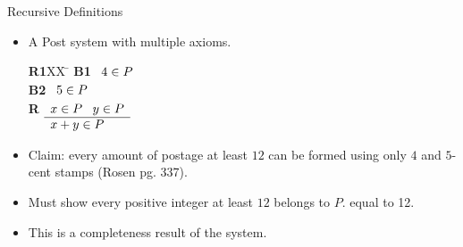 \documentclass[style=sailor,size=12pt]{powerdot}
\begin{document}
\begin{wideslide}[bm=,toc=]{Recursive Definitions}
\begin{itemize}
\item A Post system with multiple axioms.
\begin{tabbing}
{\bf R1}XX \=  \kill
{\bf B1} \>
        \(\begin{array}[t]{l}
        4\in P
        \end{array}\) \\[2ex]
{\bf B2} \>
        \(\begin{array}[t]{l}
        5\in P
        \end{array}\) \\[2ex]
        
{\bf R} \>
        \(\begin{array}[t]{l}
        x \in P \;\;\;y \in P \\
        \hline
        x + y \in P
        \end{array}\)
\end{tabbing}
\item Claim: every amount of postage at least $12$ can be formed using only $4$
and $5$-cent stamps (Rosen pg. 337).
\item Must show every positive integer at least $12$ belongs to $P$. 
equal to 12.
\item This is a completeness result of the system.
\end{itemize}
\end{wideslide}
\end{document}
